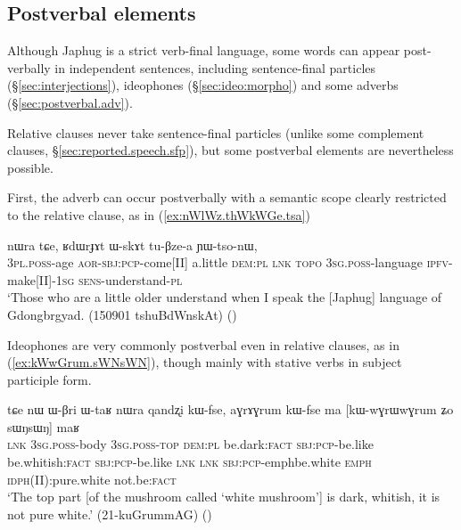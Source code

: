 \subsection{Postverbal elements} \label{sec:relative.postverbal}
Although Japhug is a strict verb-final language, some words can appear post-verbally in independent sentences, including sentence-final particles (§\ref{sec:interjections}), ideophones (§\ref{sec:ideo:morpho}) and some adverbs (§\ref{sec:postverbal.adv}).

Relative clauses never take sentence-final particles (unlike some complement clauses, §\ref{sec:reported.speech.sfp}), but some postverbal elements are nevertheless possible. 

First, the adverb  can occur postverbally with a semantic scope clearly restricted to the relative clause, as in (\ref{ex:nWlWz.thWkWGe.tsa}) 

\begin{exe}
\ex \label{ex:nWlWz.thWkWGe.tsa}
 nɯra tɕe, ʁdɯrɟɤt ɯ-skɤt tu-βze-a ɲɯ-tso-nɯ, \\
\textsc{3pl}.\textsc{poss}-age \textsc{aor}-\textsc{sbj}:\textsc{pcp}-come[II] a.little \textsc{dem}:\textsc{pl} \textsc{lnk}  \textsc{topo} \textsc{3sg}.\textsc{poss}-language \textsc{ipfv}-make[II]-\textsc{1sg} \textsc{sens}-understand-\textsc{pl} \\
\glt `Those who are a little older understand when I speak the [Japhug] language of Gdongbrgyad. (150901 tshuBdWnskAt)
()
\end{exe} 

Ideophones are very commonly postverbal even in relative clauses, as in (\ref{ex:kWwGrum.sWNsWN}), though mainly with stative verbs in subject participle form.

\begin{exe}
\ex \label{ex:kWwGrum.sWNsWN}
\gll tɕe nɯ ɯ-βri ɯ-taʁ nɯra qandʐi kɯ-fse, aɣrɤɣrum kɯ-fse  ma [kɯ-wɣrɯ\redp{}wɣrum ʑo sɯŋsɯŋ] maʁ \\
\textsc{lnk} \textsc{3sg}.\textsc{poss}-body \textsc{3sg}.\textsc{poss}-\textsc{top} \textsc{dem}:\textsc{pl} be.dark:\textsc{fact} \textsc{sbj}:\textsc{pcp}-be.like be.whitish:\textsc{fact} \textsc{sbj}:\textsc{pcp}-be.like \textsc{lnk} \textsc{lnk} \textsc{sbj}:\textsc{pcp}-emph\redp{}be.white \textsc{emph} \textsc{idph}(II):pure.white not.be:\textsc{fact} \\
\glt `The top part [of the mushroom called  `white mushroom'] is dark, whitish, it is not pure white.' (21-kuGrummAG)
()
\end{exe} 

